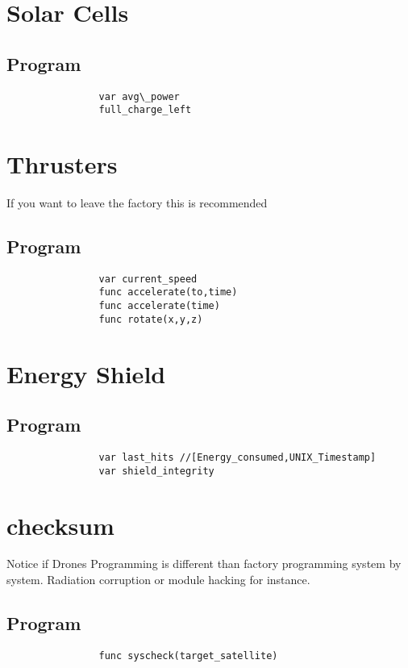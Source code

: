 \documentclass[a4paper]{scrreprt}
\begin{document}
    \section{Solar Cells}
        \subsection{Program}
            \begin{verbatim}
                var avg\_power
                full_charge_left
            \end{verbatim}
    \section{Thrusters}
        If you want to leave the factory this is  recommended
        \subsection{Program}
            \begin{verbatim}
                var current_speed
                func accelerate(to,time)
                func accelerate(time)
                func rotate(x,y,z)
            \end{verbatim}
    \section{Energy Shield}
        \subsection{Program}
            \begin{verbatim}
                var last_hits //[Energy_consumed,UNIX_Timestamp]
                var shield_integrity
            \end{verbatim}
    \section{checksum}
        Notice if Drones Programming is different than factory programming system by system. Radiation corruption or module hacking for instance.
        \subsection{Program}
            \begin{verbatim}
                func syscheck(target_satellite)
            \end{verbatim}
\end{document}
